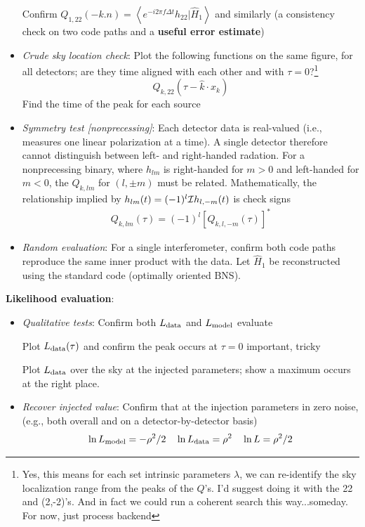 \documentclass[twocolumn,prd,nofootinbib]{revtex4}
\newcommand\editremark[1]{{\color{red} #1}}
\newcommand\qmstateproduct[2]{\left\langle#1|#2\right\rangle}
\begin{document}
\begin{widetext}
\begin{widetext}
\begin{itemize}
Confirm $Q_{1,22}(-k.n) = \qmstateproduct{e^{-i2\pi f \Delta t}h_{22}}{\hat{H}_1}$ and similarly (a consistency check on
two code paths and a \textbf{useful error estimate})


\item \emph{Crude sky location check}: Plot the following functions on the same figure, for all detectors; are they time
  aligned with each other and with $\tau=0$?\footnote{Yes, this means for each set intrinsic parameters $\lambda$, we
    can re-identify the sky localization range from the peaks of the $Q$'s.  I'd suggest doing it with the 22 and
    (2,-2)'s.  And in fact we could run a coherent search this way...someday. For now, just process backend}
\[
Q_{k,22}(\tau-\hat{k}\cdot x_k)
\]
Find the time of the peak for each source

\item \emph{Symmetry test [nonprecessing]}: Each detector data is real-valued (i.e., measures one linear polarization at
  a time).   A single detector therefore cannot distinguish between left- and right-handed radation.  For a
  nonprecessing binary, where $h_{lm}$ is right-handed for $m>0$ and left-handed for $m<0$, the $Q_{k,lm}$ for  $(l,\pm
  m)$  must be related.  Mathematically, the relationship implied by $h_{lm}(t) = (-1)^l{\cal I}h_{l,-m}(t)$ is    \editremark{check signs}
\begin{eqnarray}
Q_{k,lm}(\tau) = (-1)^l [Q_{k,l,-m}(\tau)]^*
\end{eqnarray}


\item \emph{Random evaluation}: For a single interferometer, confirm both code paths reproduce the same inner product
  with the data.   Let $\hat{H}_1$ be reconstructed using the standard code (optimally oriented BNS).
\end{itemize}

\noindent \textbf{Likelihood evaluation}:
\begin{itemize}
\item \emph{Qualitative tests}:  Confirm both $L_{\rm data}$ and $L_{\rm model}$ evaluate

Plot  $L_{\rm data}(\tau)$ and confirm the peak occurs at $\tau=0$ \editremark{important, tricky}

Plot $L_{\rm data}$ over the sky at the injected parameters; show a maximum occurs at the right place.

\item \emph{Recover injected value}: Confirm that at the injection parameters in zero noise, (e.g., both overall and on
  a detector-by-detector basis)
\[
\ln L_{\rm model}=-\rho^2/2 \quad 
\ln L_{\rm data} = \rho^2 \quad
\ln L = \rho^2/2
\]


\end{itemize}
\end{widetext}
\end{widetext}
\end{document}
